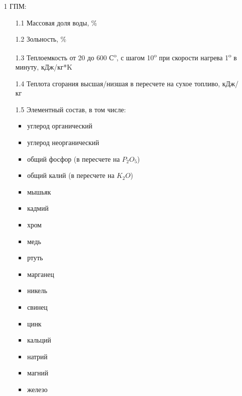 \documentclass[russian,utf8]{eskdtext}
\begin{document}
\begin{enumerate}
\item[1] ГПМ:
   \begin{enumerate}
   \item[1.1] Массовая доля воды, \%
   \item[1.2] Зольность, \%
   \item[1.3] Теплоемкость от 20 до 600 С\textsuperscript{o}, с шагом 10\textsuperscript{o} при скорости нагрева 1\textsuperscript{o} в минуту, кДж/кг*K
   \item[1.4] Теплота сгорания высшая/низшая в пересчете на сухое топливо, кДж/кг
   \item[1.5] Элементный состав, в том числе:
   \begin{itemize}
         \item углерод органический
         \item углерод неорганический
         \item общий фосфор (в пересчете на $P_{2}O_{5}$)
         \item общий калий (в пересчете на  $K_{2}O$)
            \item мышьяк
            \item кадмий
            \item хром 
            \item медь
            \item ртуть
            \item марганец 
            \item никель 
            \item свинец 
            \item цинк
            \item кальций 
            \item натрий 
            \item магний 
            \item железо
            \end{itemize}
      \end{enumerate}
      

\end{enumerate}
\end{document}
